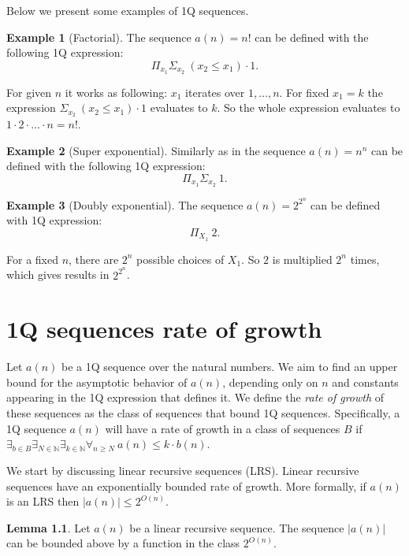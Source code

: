 \documentclass[en]{pracamgr}
\theoremstyle{definition}
\newtheorem{lemma}[theorem]{Lemma}
\newtheorem{example}{Example}[section]
\begin{document}
Below we present some examples of 1Q sequences.

\begin{example}[Factorial]
\label{ExSeqFactorial}
    The sequence $a(n) = n!$ can be defined with the following 1Q expression: 
    $$\Pi_{x_1}\Sigma_{x_2} \ (x_2 \leq x_1) \cdot 1.$$

    For given $n$ it works as following: $x_1$ iterates over $1,\ldots,n$. For fixed $x_1 = k$ the expression $\Sigma_{x_2} \ (x_2 \leq x_1) \cdot 1$ evaluates to $k$. So the whole expression evaluates to $1 \cdot 2 \cdot \ldots \cdot n = n!$.
\end{example}

\begin{example}[Super exponential]
\label{ExSeqNToN}
    Similarly as in  the sequence $a(n) = n^n$ can be defined with the following 1Q expression:
    $$\Pi_{x_1}\Sigma_{x_2} \ 1.$$
\end{example}

\begin{example}[Doubly exponential]
\label{ExSeqDoubleExponential}
    The sequence $a(n) = 2^{2^n}$ can be defined with 1Q expression:
    $$\Pi_{X_1} \ 2.$$

    For a fixed $n$, there are $2^n$ possible choices of $X_1$. So $2$ is multiplied $2^n$ times, which gives results in $2^{2^n}$.
\end{example}

\chapter{1Q sequences rate of growth}
\label{Sec1QRateOfGrowth}
Let $a(n)$ be a 1Q sequence over the natural numbers. We aim to find an upper bound for the asymptotic behavior of $a(n)$, depending only on $n$ and constants appearing in the 1Q expression that defines it. We define the \emph{rate of growth} of these sequences as the class of sequences that bound 1Q sequences. Specifically, a 1Q sequence $a(n)$ will have a rate of growth in a class of sequences $B$ if $\exists_{b \in B} \exists_{N \in \mathbb{N}} \exists_{k \in \mathbb{N}} \forall_{n \geq N} \ a(n) \leq k \cdot b(n)$.

We start by discussing linear recursive sequences (LRS). Linear recursive sequences have an exponentially bounded rate of growth. More formally, if $a(n)$ is an LRS then $|a(n)| \le 2^{O(n)}$.

\begin{lemma}
    Let $a(n)$ be a linear recursive sequence. The sequence $|a(n)|$ can be bounded above by a function in the class $2^{O(n)}$.
\end{lemma}
\end{document}

